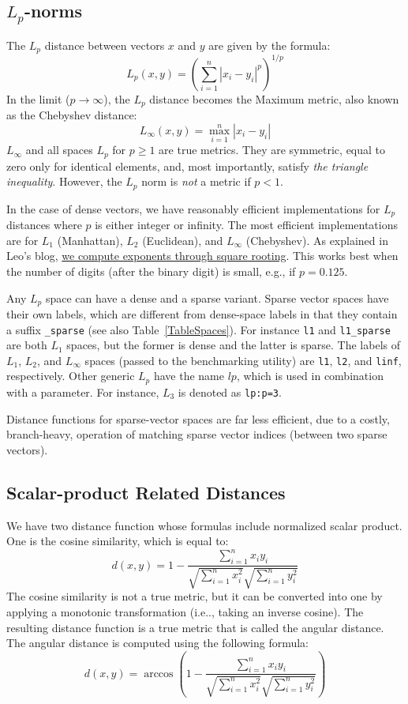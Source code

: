 \documentclass[runningheads,a4paper]{llncs}
\newcommand{\ttt}[1]{\texttt{#1}}
\begin{document}
\subsection{$L_p$-norms}\label{SectionLP}
The $L_p$ distance between vectors $x$ and $y$ are
given by the formula:
\begin{equation}\label{EqMink}
L_p(x,y) = \left(\sum_{i=1}^n |x_i-y_i|^p\right)^{1/p}
\end{equation}
In the limit ($p \rightarrow \infty$),
the $L_p$ distance becomes the Maximum metric, also known as 
the Chebyshev distance:
\begin{equation}\label{EqCheb}
L_{\infty}(x,y) = \max\limits_{i=1}^n |x_i-y_i|
\end{equation}
$L_{\infty}$ and all spaces $L_p$ for $p \ge 1$
are true metrics. 
They are symmetric, equal to zero only for identical elements,
and, most importantly, satisfy \emph{the triangle inequality}.
However, the $L_p$ norm is \emph{not} a metric if $p<1$.

In the case of dense vectors, 
we have reasonably efficient implementations 
for $L_p$ distances where $p$ is either integer or infinity. 
The most efficient implementations are for $L_1$ (Manhattan),
$L_2$ (Euclidean), and $L_{\infty}$ (Chebyshev).
As explained in Leo's blog,
\href{http://searchivarius.org/blog/efficient-exponentiation-square-rooting}{we compute exponents through square rooting}. 
This works best when the number of digits (after the binary digit) is small, e.g., if $p=0.125$.

Any $L_p$ space can have a dense and a sparse variant.
Sparse vector spaces have their own labels, which are different
from dense-space labels in that they contain a suffix \ttt{\_sparse} (see also Table~\ref{TableSpaces}).
For instance \texttt{l1} and \texttt{l1\_sparse} are both $L_1$ spaces,
but the former is dense and the latter is sparse.
The labels of $L_1$, $L_2$, and $L_\infty$ spaces (passed to the benchmarking utility) are
\ttt{l1}, \ttt{l2}, and \ttt{linf}, respectively.
Other generic $L_p$ have the name $lp$, which is used in combination with a parameter.
For instance, $L_3$ is denoted as \ttt{lp:p=3}.

Distance functions for sparse-vector spaces are far less efficient, 
due to a costly, branch-heavy, operation of matching sparse vector indices
(between two sparse vectors).

\subsection{Scalar-product Related Distances}
We have two distance function whose formulas include normalized scalar product.
One is the cosine similarity, which is equal to:
$$
d(x,y) =1-\frac{\sum_{i=1}^n x_i y_i} 
{\sqrt{\sum_{i=1}^n x_i^2} \sqrt{\sum_{i=1}^n y_i^2 } } 
$$ 
The cosine similarity is not a true metric, but it can be converted into
one by applying a monotonic transformation (i.e.., taking an inverse cosine).
The resulting distance function is a true metric that 
is called the angular distance.
The angular distance is computed using the following formula:
$$
d(x,y) =\arccos\left(1-\frac{\sum_{i=1}^n x_i y_i} 
{\sqrt{\sum_{i=1}^n x_i^2} \sqrt{\sum_{i=1}^n y_i^2 } }\right) 
$$ 
\end{document}
